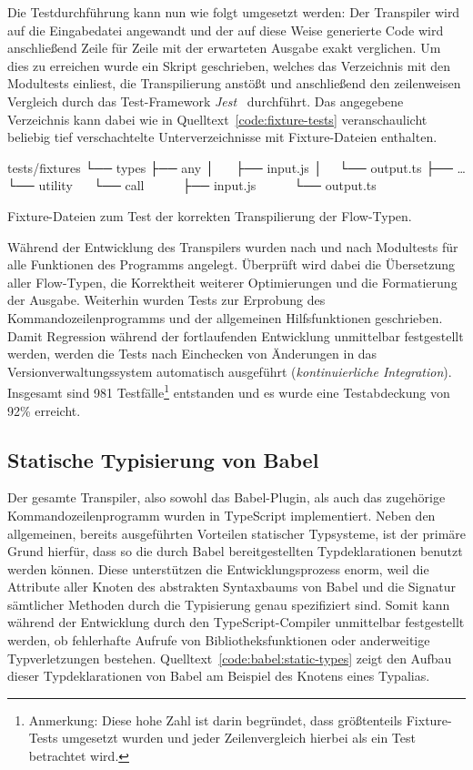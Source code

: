 {Die Testdurchführung kann nun wie folgt umgesetzt werden: Der Transpiler wird auf die Eingabedatei angewandt und der auf diese Weise generierte Code wird anschließend Zeile für Zeile mit der erwarteten Ausgabe exakt verglichen. Um dies zu erreichen wurde ein Skript geschrieben, welches das Verzeichnis mit den Modultests einliest, die Transpilierung anstößt und anschließend den zeilenweisen Vergleich durch das Test-Framework \textit{Jest}~\autocite{SOFTWARE:JEST} durchführt. Das angegebene Verzeichnis kann dabei wie in Quelltext~\ref{code:fixture-tests} veranschaulicht beliebig tief verschachtelte Unterverzeichnisse mit Fixture-Dateien enthalten.

\bigbreak
\begin{listing}[htb]
\begin{textcode}
tests/fixtures
└── types
    ├── any
    │     ├── input.js
    │     └── output.ts
    ├── …
    └── utility
        └── call
            ├── input.js
            └── output.ts
\end{textcode}
\listingvspace
\caption{Fixture-Dateien zum Test der korrekten Transpilierung der Flow-Typen.}
\label{code:fixture-tests}
\end{listing}

Während der Entwicklung des Transpilers wurden nach und nach Modultests für alle Funktionen des Programms angelegt. Überprüft wird dabei die Übersetzung aller Flow-Typen, die Korrektheit weiterer Optimierungen und die Formatierung der Ausgabe. Weiterhin wurden Tests zur Erprobung des Kommandozeilenprogramms und der allgemeinen Hilfsfunktionen geschrieben. Damit Regression während der fortlaufenden Entwicklung unmittelbar festgestellt werden, werden die Tests nach Einchecken von Änderungen in das Versionverwaltungssystem automatisch ausgeführt (\textit{kontinuierliche Integration}). Insgesamt sind 981 Testfälle\footnote{Anmerkung: Diese hohe Zahl ist darin begründet, dass größtenteils Fixture-Tests umgesetzt wurden und jeder Zeilenvergleich hierbei als ein Test betrachtet wird.} entstanden und es wurde eine Testabdeckung von 92\% erreicht.

\subsection{Statische Typisierung von Babel}

Der gesamte Transpiler, also sowohl das Babel-Plugin, als auch das zugehörige Kommandozeilenprogramm wurden in TypeScript implementiert. Neben den allgemeinen, bereits ausgeführten Vorteilen statischer Typsysteme, ist der primäre Grund hierfür, dass so die durch Babel bereitgestellten Typdeklarationen benutzt werden können. Diese unterstützen die Entwicklungsprozess enorm, weil die Attribute aller Knoten des abstrakten Syntaxbaums von Babel und die Signatur sämtlicher Methoden durch die Typisierung genau spezifiziert sind. Somit kann während der Entwicklung durch den TypeScript-Compiler unmittelbar festgestellt werden, ob fehlerhafte Aufrufe von Bibliotheksfunktionen oder anderweitige Typverletzungen bestehen. Quelltext~\ref{code:babel:static-types} zeigt den Aufbau dieser Typdeklarationen von Babel am Beispiel des Knotens eines Typalias.

}
